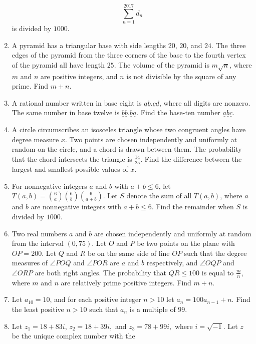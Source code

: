 \documentclass{article}
\begin{document}
\begin{enumerate}[label=\arabic*., itemsep=0.5em]
\begin{equation*}
\sum_{n=1}^{2017} d_n
\end{equation*}
is divided by $1000$.\par \vspace{0.5em}\item A pyramid has a triangular base with side lengths $20$, $20$, and $24$. The three edges of the pyramid from the three corners of the base to the fourth vertex of the pyramid all have length $25$. The volume of the pyramid is $m\sqrt{n}$, where $m$ and $n$ are positive integers, and $n$ is not divisible by the square of any prime. Find $m+n$.\par \vspace{0.5em}\item A rational number written in base eight is $\underline{a} \underline{b} . \underline{c} \underline{d}$, where all digits are nonzero. The same number in base twelve is $\underline{b} \underline{b} . \underline{b} \underline{a}$. Find the base-ten number $\underline{a} \underline{b} \underline{c}$.\par \vspace{0.5em}\item A circle circumscribes an isosceles triangle whose two congruent angles have degree measure $x$. Two points are chosen independently and uniformly at random on the circle, and a chord is drawn between them. The probability that the chord intersects the triangle is $\frac{14}{25}$. Find the difference between the largest and smallest possible values of $x$.\par \vspace{0.5em}\item For nonnegative integers $a$ and $b$ with  $a + b \leq 6$, let $T(a, b) = \binom{6}{a} \binom{6}{b} \binom{6}{a + b}$. Let $S$ denote the sum of all $T(a, b)$, where  $a$ and $b$ are nonnegative integers with $a + b \leq 6$. Find the remainder when $S$ is divided by $1000$.\par \vspace{0.5em}\item Two real numbers $a$ and $b$ are chosen independently and uniformly at random from the interval $(0, 75)$. Let $O$ and $P$ be two points on the plane with $OP = 200$. Let $Q$ and $R$ be on the same side of line $OP$ such that the degree measures of $\angle POQ$ and $\angle POR$ are $a$ and $b$ respectively, and $\angle OQP$ and $\angle ORP$ are both right angles. The probability that $QR \leq 100$ is equal to $\frac{m}{n}$, where $m$ and $n$ are relatively prime positive integers. Find $m + n$.\par \vspace{0.5em}\item Let $a_{10} = 10$, and for each positive integer $n >10$ let $a_n = 100a_{n - 1} + n$. Find the least positive $n > 10$ such that $a_n$ is a multiple of $99$.\par \vspace{0.5em}\item Let $z_1 = 18 + 83i$, $z_2 = 18 + 39i, $ and $z_3 = 78 + 99i,$ where $i = \sqrt{-1}$. Let $z$ be the unique complex number with the 
\end{enumerate}
\end{document}

